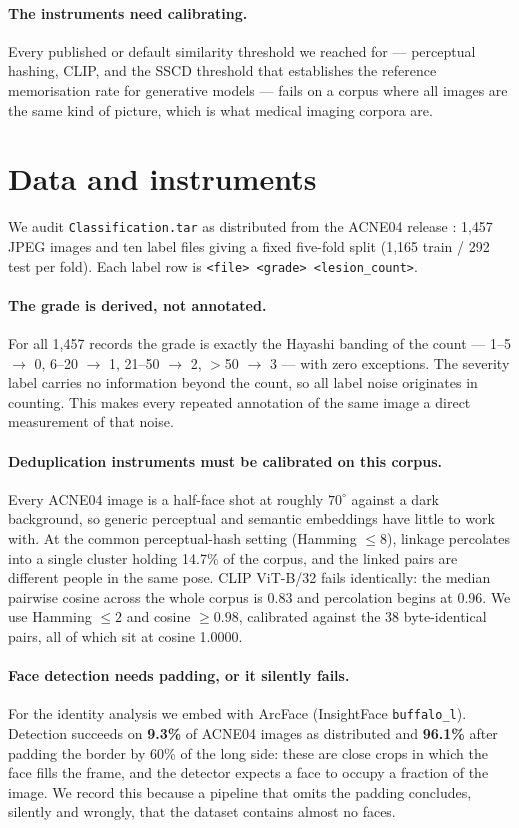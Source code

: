 \documentclass[11pt]{article}
\begin{document}
\paragraph{The instruments need calibrating.} Every published or default similarity
threshold we reached for --- perceptual hashing, CLIP, and the SSCD threshold that
establishes the reference memorisation rate for generative models --- fails on a corpus
where all images are the same kind of picture, which is what medical imaging corpora are.

\section{Data and instruments}

We audit \texttt{Classification.tar} as distributed from the ACNE04 release
\citep{wu2019}: 1{,}457 JPEG images and ten label files giving a fixed five-fold split
(1{,}165 train / 292 test per fold). Each label row is
\texttt{<file> <grade> <lesion\_count>}.

\paragraph{The grade is derived, not annotated.}
For all 1{,}457 records the grade is exactly the Hayashi banding of the count ---
1--5 $\rightarrow$ 0, 6--20 $\rightarrow$ 1, 21--50 $\rightarrow$ 2, $>$50 $\rightarrow$
3 --- with zero exceptions. The severity label carries no information beyond the count,
so all label noise originates in counting. This makes every repeated annotation of the
same image a direct measurement of that noise.

\paragraph{Deduplication instruments must be calibrated on this corpus.}
Every ACNE04 image is a half-face shot at roughly $70^\circ$ against a dark background,
so generic perceptual and semantic embeddings have little to work with. At the common
perceptual-hash setting (Hamming $\leq 8$), linkage percolates into a single cluster
holding 14.7\% of the corpus, and the linked pairs are different people in the same
pose. CLIP ViT-B/32 fails identically: the median pairwise cosine across the whole
corpus is 0.83 and percolation begins at 0.96. We use Hamming $\leq 2$ and cosine
$\geq 0.98$, calibrated against the 38 byte-identical pairs, all of which sit at cosine
1.0000.

\paragraph{Face detection needs padding, or it silently fails.}
For the identity analysis we embed with ArcFace (InsightFace \texttt{buffalo\_l}).
Detection succeeds on \textbf{9.3\%} of ACNE04 images as distributed and \textbf{96.1\%}
after padding the border by 60\% of the long side: these are close crops in which the
face fills the frame, and the detector expects a face to occupy a fraction of the image.
We record this because a pipeline that omits the padding concludes, silently and
wrongly, that the dataset contains almost no faces.
\end{document}

